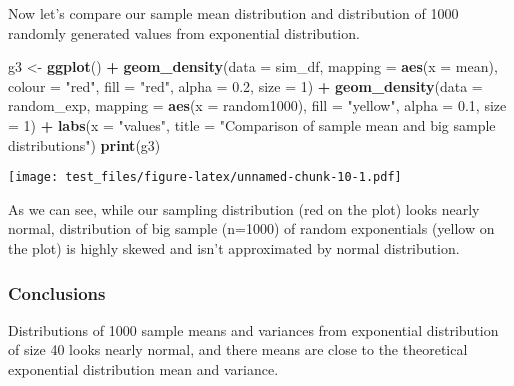 \documentclass[]{article}
\newenvironment{Shaded}{\begin{snugshade}}{\end{snugshade}}
\newcommand{\KeywordTok}[1]{\textcolor[rgb]{0.13,0.29,0.53}{\textbf{#1}}}
\newcommand{\DataTypeTok}[1]{\textcolor[rgb]{0.13,0.29,0.53}{#1}}
\newcommand{\DecValTok}[1]{\textcolor[rgb]{0.00,0.00,0.81}{#1}}
\newcommand{\FloatTok}[1]{\textcolor[rgb]{0.00,0.00,0.81}{#1}}
\newcommand{\StringTok}[1]{\textcolor[rgb]{0.31,0.60,0.02}{#1}}
\newcommand{\OperatorTok}[1]{\textcolor[rgb]{0.81,0.36,0.00}{\textbf{#1}}}
\newcommand{\NormalTok}[1]{#1}
\begin{document}
Now let's compare our sample mean distribution and distribution of 1000
randomly generated values from exponential distribution.

\begin{Shaded}
\begin{Highlighting}[]
\NormalTok{g3 <-}\StringTok{ }\KeywordTok{ggplot}\NormalTok{() }\OperatorTok{+}\StringTok{ }
\StringTok{  }\KeywordTok{geom_density}\NormalTok{(}\DataTypeTok{data =}\NormalTok{ sim_df, }\DataTypeTok{mapping =} \KeywordTok{aes}\NormalTok{(}\DataTypeTok{x =}\NormalTok{ mean), }\DataTypeTok{colour =} \StringTok{"red"}\NormalTok{, }\DataTypeTok{fill =} \StringTok{"red"}\NormalTok{, }\DataTypeTok{alpha =} \FloatTok{0.2}\NormalTok{, }\DataTypeTok{size =} \DecValTok{1}\NormalTok{) }\OperatorTok{+}
\StringTok{  }\KeywordTok{geom_density}\NormalTok{(}\DataTypeTok{data =}\NormalTok{ random_exp, }\DataTypeTok{mapping =} \KeywordTok{aes}\NormalTok{(}\DataTypeTok{x =}\NormalTok{ random1000), }\DataTypeTok{fill =} \StringTok{"yellow"}\NormalTok{, }\DataTypeTok{alpha =} \FloatTok{0.1}\NormalTok{, }\DataTypeTok{size =} \DecValTok{1}\NormalTok{) }\OperatorTok{+}
\StringTok{  }\KeywordTok{labs}\NormalTok{(}\DataTypeTok{x =} \StringTok{"values"}\NormalTok{, }\DataTypeTok{title =} \StringTok{"Comparison of sample mean and big sample distributions"}\NormalTok{)}
\KeywordTok{print}\NormalTok{(g3)}
\end{Highlighting}
\end{Shaded}

\texttt{[image: test\_files/figure-latex/unnamed-chunk-10-1.pdf]}

As we can see, while our sampling distribution (red on the plot) looks
nearly normal, distribution of big sample (n=1000) of random
exponentials (yellow on the plot) is highly skewed and isn't
approximated by normal distribution.

\subsubsection{Conclusions}\label{conclusions}

Distributions of 1000 sample means and variances from exponential
distribution of size 40 looks nearly normal, and there means are close
to the theoretical exponential distribution mean and variance.
\end{document}

